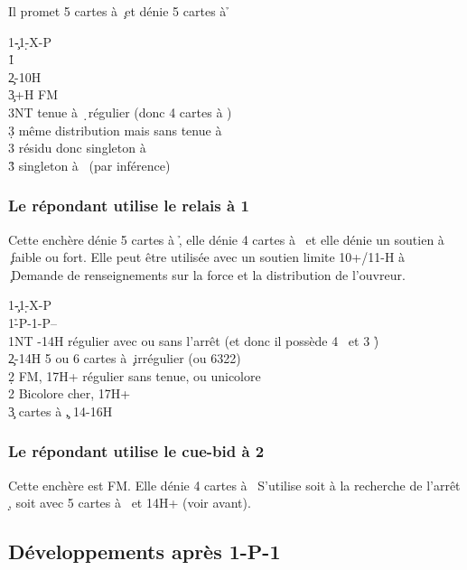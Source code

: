 \documentclass[a4paper]{article}
\begin{document}
Il promet 5 cartes à \c\ et dénie 5 cartes à \h 

\begin{bidtable}
1\c-1\d-X-P\\
1\h\+\\
2\c {}-10H\\
3\c {}+H FM\+\\
3NT \> tenue à \d\ régulier (donc 4 cartes à \s )\\
3\d \> même distribution mais sans tenue à \s \\
3\s \> résidu donc singleton à \d \\
3\h \> singleton à \s\ (par inférence)\-\-
\end{bidtable}

\subsubsection{Le répondant utilise le relais à 1 \pdfs}

Cette enchère dénie 5 cartes à \h , elle dénie 4 cartes à \s\ et elle dénie un soutien à \c\ faible ou fort.
Elle peut être utilisée avec un soutien limite 10+/11-H à \c\ 
Demande de renseignements sur la force et la distribution de l’ouvreur.

\begin{bidtable}
1\c-1\d-X-P\\
1\h-P-1\s-P--\\
1NT -14H régulier avec ou sans l’arrêt (et donc il possède 4 \s\ et 3 \h )\\
2\c \> 12-14H 5 ou 6 cartes à \c\ irrégulier (ou 6322)\\
2\d \> FM, 17H+ régulier sans tenue, ou unicolore \c \\
2\s \> Bicolore cher, 17H+\\
3\c {} cartes à \c , 14-16H
\end{bidtable}

\subsubsection{Le répondant utilise le cue-bid à 2 \pdfd}

Cette enchère est FM. Elle dénie 4 cartes à \s\ 
S’utilise soit à la recherche de l’arrêt \d , soit avec 5 cartes à \s\ et 14H+ (voir avant).

\subsection{Développements après 1\pdfc-1\pdfd-1\pdfh-P-1\pdfs}
\end{document}
